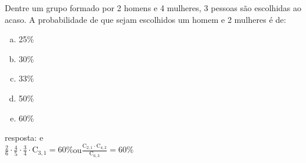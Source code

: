 \begin{ex}
 Dentre um grupo formado por 2 homens e 4 mulheres, 3 pessoas são escolhidas ao acaso. A probabilidade de que sejam escolhidos um homem e 2 mulheres é de:
    \begin{enumerate}[(a)]
    \item 25\%
    \item 30\%
    \item 33\%
    \item 50\%
    \item 60\%
    \end{enumerate}
      \begin{sol}
      resposta: e \\
      $\frac{2}{6}\cdot\frac{4}{5}\cdot\frac{3}{4}\cdot\mathrm{C}_{3,1}=60\%$\hspace{0.5cm}ou\hspace{0.5cm}$\frac{\mathrm{C}_{2,1}\cdot\mathrm{C}_{4,2}}{\mathrm{C}_{6,3}}=60\%$
      \end{sol}
\end{ex}